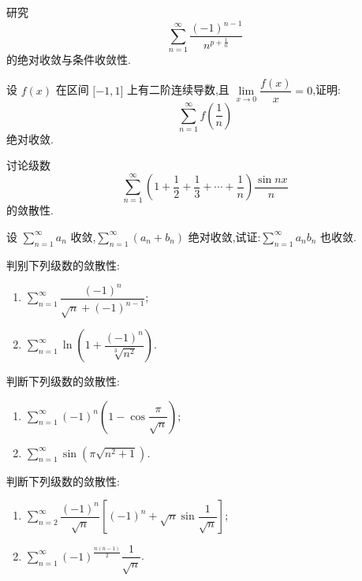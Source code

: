 \documentclass[../../数学分析培优讲义.tex]{subfiles}
\begin{document}
\begin{example}
研究
\[
    \sum\limits_{n=1}^{\infty}\dfrac{(-1)^{n-1}}{n^{p+\frac{1}{n}}}
\]
的绝对收敛与条件收敛性.
\end{example}
\exampleblank

\begin{example}
设 $f(x)$ 在区间 $\lbrack -1,1\rbrack$ 上有二阶连续导数,且 $\displaystyle\lim\limits_{x\to0}\dfrac{f(x)}{x}=0$,证明:
\[
    \sum\limits_{n=1}^{\infty}f\left(\dfrac{1}{n}\right)
\]
绝对收敛.
\end{example}
\exampleblank

\begin{example}
讨论级数
\[
    \sum\limits_{n=1}^{\infty}\left(1+\dfrac{1}{2}+\dfrac{1}{3}+\cdots+\dfrac{1}{n}\right)\dfrac{\sin nx}{n}
\]
的敛散性.
\end{example}
\exampleblank

\begin{example}
设 $\displaystyle\sum\limits_{n=1}^{\infty}a_n$ 收敛,$\displaystyle\sum\limits_{n=1}^{\infty}(a_n+b_n)$ 绝对收敛,试证:$\displaystyle\sum\limits_{n=1}^{\infty}a_nb_n$ 也收敛.
\end{example}
\exampleblank

\begin{example}
判别下列级数的敛散性:
\begin{enumerate}[label=(\arabic*)]
    \item $\displaystyle\sum\limits_{n=1}^{\infty}\dfrac{(-1)^n}{\sqrt n+(-1)^{n-1}}$;
    \item $\displaystyle\sum\limits_{n=1}^{\infty}\ln\left(1+\dfrac{(-1)^n}{\sqrt[3]{n^2}}\right)$.
\end{enumerate}
\end{example}
\exampleblank

\begin{example}
判断下列级数的敛散性:
\begin{enumerate}[label=(\arabic*)]
    \item $\displaystyle\sum\limits_{n=1}^{\infty}(-1)^n\left(1-\cos\dfrac{\pi}{\sqrt n}\right)$;
    \item $\displaystyle\sum\limits_{n=1}^{\infty}\sin\left(\pi\sqrt{n^2+1}\right)$.
\end{enumerate}
\end{example}
\exampleblank

\begin{example}
判断下列级数的敛散性:
\begin{enumerate}[label=(\arabic*)]
    \item $\displaystyle\sum\limits_{n=2}^{\infty}\dfrac{(-1)^n}{\sqrt n}
    \left[(-1)^n+\sqrt n\sin\dfrac{1}{\sqrt n}\right]$;
    \item $\displaystyle\sum\limits_{n=1}^{\infty}(-1)^{\frac{n(n-1)}{2}}\dfrac{1}{\sqrt n}$.
\end{enumerate}
\end{example}
\exampleblank
\end{document}

